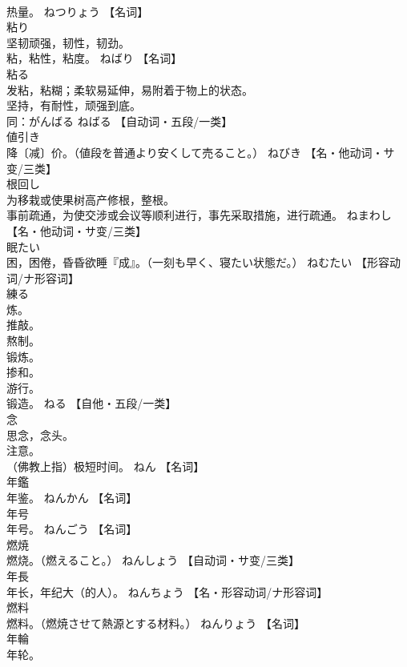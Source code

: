 \documentclass[8pt]{extreport}
\begin{document}
\begin{CJK}{UTF8}{min}
\\	热量。	ねつりょう		【名词】
\\	粘り	
\\	坚韧顽强，韧性，韧劲。 
\\	粘，粘性，粘度。	ねばり		【名词】
\\	粘る	
\\	发粘，粘糊；柔软易延伸，易附着于物上的状态。 
\\	坚持，有耐性，顽强到底。 
\\	同：がんばる	ねばる		【自动词・五段/一类】
\\	値引き	
\\	降〔减〕价。（値段を普通より安くして売ること。）	ねびき		【名・他动词・サ变/三类】
\\	根回し	
\\	为移栽或使果树高产修根，整根。 
\\	事前疏通，为使交涉或会议等顺利进行，事先采取措施，进行疏通。	ねまわし		【名・他动词・サ变/三类】
\\	眠たい	
\\	困，困倦，昏昏欲睡『成』。（一刻も早く、寝たい状態だ。）	ねむたい		【形容动词/ナ形容词】
\\	練る	
\\	炼。 
\\	推敲。 
\\	熬制。 
\\	锻炼。 
\\	掺和。 
\\	游行。 
\\	锻造。	ねる		【自他・五段/一类】
\\	念	
\\	思念，念头。 
\\	注意。 
\\	（佛教上指）极短时间。	ねん		【名词】
\\	年鑑	
\\	年鉴。	ねんかん		【名词】
\\	年号	
\\	年号。	ねんごう		【名词】
\\	燃焼	
\\	燃烧。（燃えること。）	ねんしょう		【自动词・サ变/三类】
\\	年長	
\\	年长，年纪大（的人）。	ねんちょう		【名・形容动词/ナ形容词】
\\	燃料	
\\	燃料。（燃焼させて熱源とする材料。）	ねんりょう		【名词】
\\	年輪	
\\	年轮。 

\end{CJK}
\end{document}
